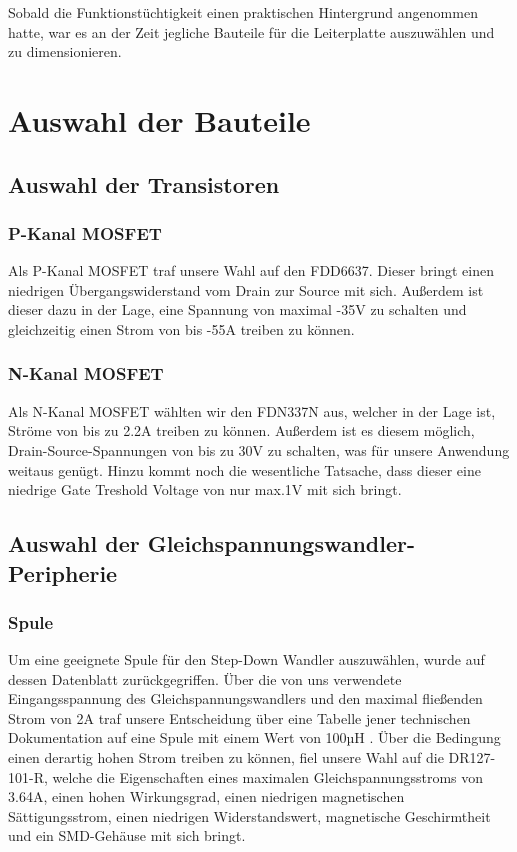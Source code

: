 Sobald die Funktionstüchtigkeit einen praktischen Hintergrund angenommen hatte,
war es an der Zeit jegliche Bauteile für die Leiterplatte auszuwählen und zu dimensionieren.


\newpage
\section{Auswahl der Bauteile}

\subsection{Auswahl der Transistoren}
\subsubsection{P-Kanal MOSFET }

Als P-Kanal MOSFET traf unsere Wahl auf den FDD6637.
Dieser bringt einen niedrigen Übergangswiderstand vom Drain zur Source mit sich.
Außerdem ist dieser dazu in der Lage, eine Spannung von maximal -35V zu schalten und gleichzeitig einen Strom von bis -55A treiben zu können.

\subsubsection{N-Kanal MOSFET }

Als N-Kanal MOSFET wählten wir den FDN337N aus, welcher in der Lage ist, Ströme von bis zu 2.2A treiben zu können.
Außerdem ist es diesem möglich, Drain-Source-Spannungen von bis zu 30V zu schalten, was für unsere Anwendung weitaus genügt.
Hinzu kommt noch die wesentliche Tatsache, dass dieser eine niedrige Gate Treshold Voltage von nur max.1V mit sich bringt.

\subsection{Auswahl der Gleichspannungswandler-Peripherie}

\subsubsection{Spule }
Um eine geeignete Spule für den Step-Down Wandler auszuwählen, wurde auf dessen Datenblatt zurückgegriffen.
Über die von uns verwendete Eingangsspannung des Gleichspannungswandlers und den maximal fließenden Strom von 2A
traf unsere Entscheidung über eine Tabelle jener technischen Dokumentation auf eine Spule mit einem Wert von 100µH .
Über die Bedingung einen derartig hohen Strom treiben zu können, fiel unsere Wahl auf die DR127-101-R,
welche die Eigenschaften eines maximalen Gleichspannungsstroms von 3.64A, einen hohen Wirkungsgrad, einen niedrigen magnetischen Sättigungsstrom,
einen niedrigen Widerstandswert, magnetische Geschirmtheit und ein \acs{SMD}-Gehäuse mit sich bringt.

